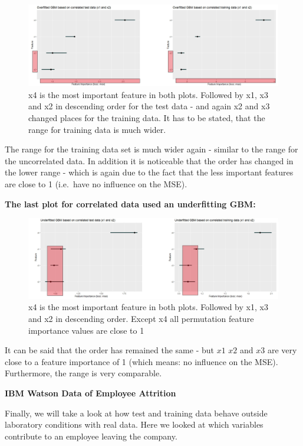 \documentclass[]{krantz}
\begin{document}
\begin{figure}
\includegraphics[width=40.06in]{images/correlated_over} \caption{x4 is the most important feature in both plots. Followed by x1, x3 and x2 in descending order for the test data - and again x2 and x3 changed places for the training data. It has to be stated, that the range for training data is much wider.}\label{fig:unnamed-chunk-55}
\end{figure}

The range for the training data set is much wider again - similar to the
range for the uncorrelated data. In addition it is noticeable that the
order has changed in the lower range - which is again due to the fact
that the less important features are close to 1 (i.e.~have no influence
on the MSE).

\textbf{The last plot for correlated data used an underfitting GBM:}

\begin{figure}
\includegraphics[width=40.57in]{images/correlated_under} \caption{x4 is the most important feature in both plots. Followed by x1, x3 and x2 in descending order. Except x4 all permutation feature importance values are close to 1}\label{fig:unnamed-chunk-56}
\end{figure}

It can be said that the order has remained the same - but \(x1\) \(x2\)
and \(x3\) are very close to a feature importance of 1 (which means: no
influence on the MSE). Furthermore, the range is very comparable.

\textbf{IBM Watson Data of Employee Attrition}

Finally, we will take a look at how test and training data behave
outside laboratory conditions with real data. Here we looked at which
variables contribute to an employee leaving the company.
\end{document}
